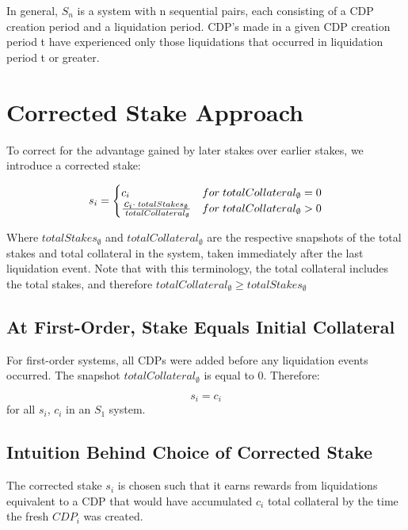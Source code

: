 \documentclass[reqno]{article}
\begin{document}
In general, $S_n$ is a system with n sequential pairs, each consisting of a CDP creation period and a liquidation period. CDP's made in a given CDP creation period t have experienced only those liquidations that occurred in liquidation period t or greater.

\section{Corrected Stake Approach}

To correct for the advantage gained by later stakes over earlier stakes, we introduce a corrected stake:

\begin{equation}
    s_i=
        \begin{cases} 
            c_i & for \;totalCollateral_\emptyset = 0\\
            \frac{\mathlarger{c_i} \cdot \; totalStakes_\emptyset} {\;totalCollateral_\emptyset} & for \;totalCollateral_\emptyset>0
        \end{cases}
\end{equation}

\bigskip
Where $totalStakes_\emptyset$ and $totalCollateral_\emptyset$ are the respective snapshots of the total stakes and total collateral in the system, taken immediately after the last liquidation event. Note that with this terminology, the total collateral includes the total stakes, and therefore $totalCollateral_\emptyset \ge totalStakes_\emptyset$

\subsection{At First-Order, Stake Equals Initial Collateral}

For first-order systems, all CDPs were added before any liquidation events occurred. The snapshot $totalCollateral_\emptyset$ is equal to 0. Therefore:

\begin{equation} 
    s_i=c_i
\end{equation}
for all $s_i$, $c_i$ in an $S_1$ system.

\subsection{Intuition Behind Choice of Corrected Stake}

The corrected stake $s_i$ is chosen such that it earns rewards from liquidations equivalent to a CDP that would have accumulated $c_i$ total collateral by the time the fresh $CDP_i$ was created.\\
\end{document}
